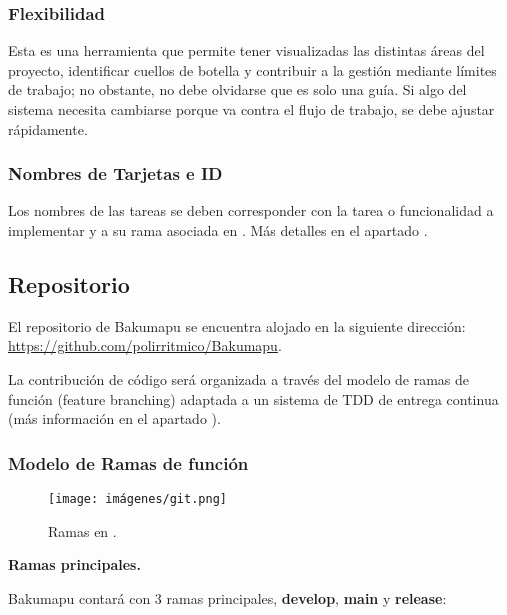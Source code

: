 \subsubsection{Flexibilidad}\label{flujo:flexibilidad}
Esta es una herramienta que permite tener visualizadas las distintas áreas del proyecto, identificar cuellos de botella y contribuir a la gestión mediante límites de trabajo; no obstante, no debe olvidarse que es solo una guía. Si algo del sistema necesita cambiarse porque va contra el flujo de trabajo, se debe ajustar rápidamente.

\subsubsection{Nombres de Tarjetas e ID}\label{flujo:nombres-de-tarjetas}
Los nombres de las tareas se deben corresponder con la tarea o funcionalidad a implementar y a su rama asociada en . Más detalles en el apartado .


\subsection{Repositorio}\label{flujo:repositorio}
El repositorio  de Bakumapu se encuentra alojado en la siguiente dirección: \url{https://github.com/polirritmico/Bakumapu}.

La contribución de código será organizada a través del modelo de ramas de función (feature branching) adaptada a un sistema de TDD de entrega continua (más información en el apartado ).

\subsubsection{Modelo de Ramas de función}\label{flujo:modelo-de-ramas}
\begin{figure}[H]
	\centering
	\texttt{[image: imágenes/git.png]}
	\caption{Ramas en .}
\end{figure}

\noindent\textbf{Ramas principales.}\label{flujo:ramas-principales}

\noindent Bakumapu contará con 3 ramas principales, \textbf{develop}, \textbf{main} y \textbf{release}:

